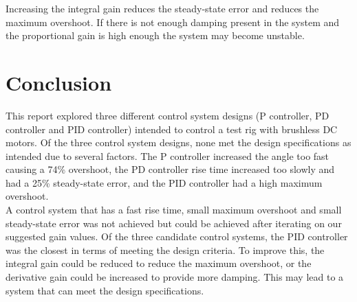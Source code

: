 \documentclass[12pt]{article} %
\begin{document}
\noindent Increasing the integral gain reduces the steady-state error and reduces the maximum overshoot. If there is not enough damping present in the system and the proportional gain is high enough the system may become unstable.

\newpage
\section*{Conclusion}

This report explored three different control system designs (P controller, PD controller and PID controller) intended to control a test rig with brushless DC motors. 
Of the three control system designs, none met the design specifications as intended due to several factors. The P controller increased the angle too fast causing a 74\% overshoot, the PD controller rise time increased too slowly and had a 25\% steady-state error, and the PID controller had a high maximum overshoot.
\\

\noindent A control system that has a fast rise time, small maximum overshoot and small steady-state error was not achieved but could be achieved after iterating on our suggested gain values.
Of the three candidate control systems, the PID controller was the closest in terms of meeting the design criteria.
To improve this, the integral gain could be reduced to reduce the maximum overshoot, or the derivative gain could be increased to provide more damping. This may lead to a system that can meet the design specifications.
\end{document}
